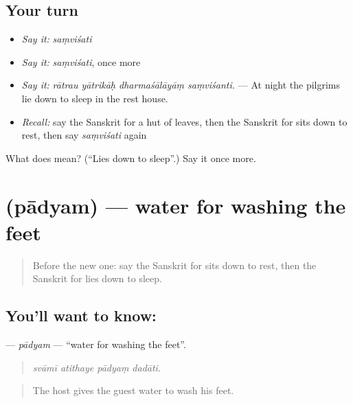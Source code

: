 \subsection*{Your turn}
\begin{itemize}
\raggedright
  \item \emph{Say it:} \emph{saṃviśati}
  \item \emph{Say it:} \emph{saṃviśati}, once more
  \item \emph{Say it:} \emph{rātrau yātrikāḥ dharmaśālāyāṃ saṃviśanti.} — At night the pilgrims lie down to sleep in the rest house.
  \item \emph{Recall:} say the Sanskrit for a hut of leaves, then the Sanskrit for sits down to rest, then say \emph{saṃviśati} again
\end{itemize}

\begin{tcolorbox}[breakable,colback=teal!4,colframe=teal!35!black,title={Before you move on}]
What does  mean? (\textquotedblleft{}Lies down to sleep\textquotedblright{}.) Say it once more.
\end{tcolorbox}
\section[\texorpdfstring{\sk{पाद्यम्} (pādyam)}{पाद्यम् (pādyam)}]{ (pādyam) — water for washing the feet}

\label{lesson:SA-C402-padyam}



\begin{quote}
Before the new one: say the Sanskrit for sits down to rest, then the Sanskrit for lies down to sleep.
\end{quote}

\subsection*{You'll want to know: }
\textbf{} — \emph{pādyam} — \textquotedblleft{}water for washing the feet\textquotedblright{}.

\begin{quote}
   
\end{quote}

\begin{quote}
\emph{svāmī atithaye pādyaṃ dadāti.}
\end{quote}

\begin{quote}
The host gives the guest water to wash his feet.
\end{quote}

